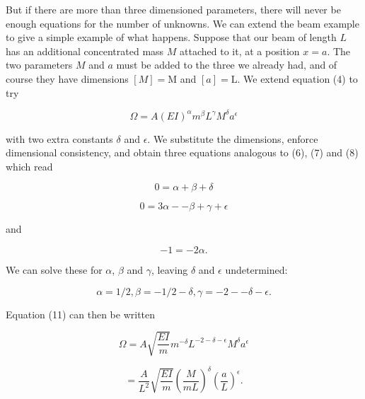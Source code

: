  But if there are more than three dimensioned parameters, there will never be 
  enough equations for the number of unknowns. We can extend the beam example 
  to give a simple example of what happens. Suppose that our beam of length $L$ 
  has an additional concentrated mass $M$ attached to it, at a position $x=a$. 
  The two parameters $M$ and $a$ must be added to the three we already had, and 
  of course they have dimensions $[M] = \mathrm{M}$ and $[a] = \mathrm{L}$. We 
  extend equation (4) to try 

  \begin{equation*}\Omega=A (EI)^\alpha m^\beta L^\gamma M^\delta a^\epsilon 
  \tag{11}\end{equation*} 

  \noindent{}with two extra constants $\delta$ and $\epsilon$. We substitute 
  the dimensions, enforce dimensional consistency, and obtain three equations 
  analogous to (6), (7) and (8) which read 

  \begin{equation*}0=\alpha + \beta + \delta \tag{12}\end{equation*} 

  \begin{equation*}0 = 3 \alpha -- \beta + \gamma + \epsilon 
  \tag{13}\end{equation*} 

  \noindent{}and 

  \begin{equation*}-1=-2 \alpha. \tag{14}\end{equation*} 

  We can solve these for $\alpha$, $\beta$ and $\gamma$, leaving $\delta$ and 
  $\epsilon$ undetermined: 

  \begin{equation*}\alpha = 1/2, \beta = -1/2 -\delta, \gamma= -2 -- \delta 
  -\epsilon . \tag{15}\end{equation*} 

  Equation (11) can then be written 

  \begin{equation*}\Omega= A \sqrt{\dfrac{EI}{m}} m^{-\delta} L^{-2 -\delta 
  -\epsilon} M^\delta a^\epsilon \end{equation*} 

  \begin{equation*}= \dfrac{A}{L^2} \sqrt{\dfrac{EI}{m}} \left(\dfrac{M}{mL} 
  \right)^\delta \left(\dfrac{a}{L} \right)^\epsilon . \tag{16}\end{equation*} 

